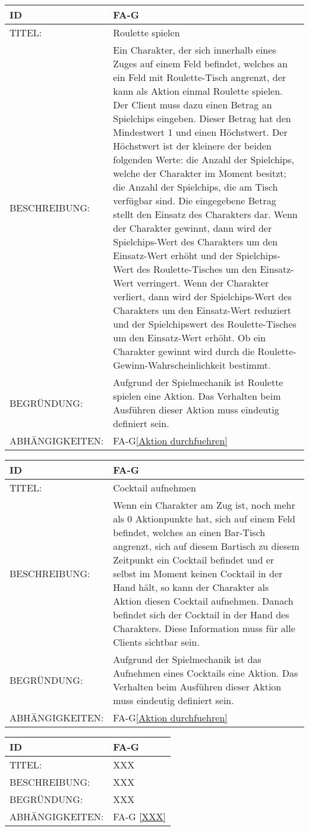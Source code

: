 \begin{tabularx}{16cm}{l|X}
	{table}\label{Roulette spielen}
	\textbf{ID} & \textbf{FA-G\arabic{table}} \\
	\hline
	TITEL: & Roulette spielen \\
	\hline
	BESCHREIBUNG: & Ein Charakter, der sich innerhalb eines Zuges auf einem Feld befindet, welches an ein Feld mit Roulette-Tisch angrenzt, der kann als Aktion einmal Roulette spielen. Der Client muss dazu einen Betrag an Spielchips eingeben. Dieser Betrag hat den Mindestwert 1 und einen Höchstwert. Der Höchstwert ist der kleinere der beiden folgenden Werte: die Anzahl der Spielchips, welche der Charakter im Moment besitzt; die Anzahl der Spielchips, die am Tisch verfügbar sind. Die eingegebene Betrag stellt den Einsatz des Charakters dar. Wenn der Charakter gewinnt, dann wird der Spielchips-Wert des Charakters um den Einsatz-Wert erhöht und der Spielchips-Wert des Roulette-Tisches um den Einsatz-Wert verringert. Wenn der Charakter verliert, dann wird der Spielchips-Wert des Charakters um den Einsatz-Wert reduziert und der Spielchipswert des Roulette-Tisches um den Einsatz-Wert erhöht. Ob ein Charakter gewinnt wird durch die Roulette-Gewinn-Wahrscheinlichkeit bestimmt.\\
	 
	\hline
	BEGRÜNDUNG: & Aufgrund der Spielmechanik ist Roulette spielen eine Aktion. Das Verhalten beim Ausführen dieser Aktion muss eindeutig definiert sein.\\
	\hline
	ABHÄNGIGKEITEN: & FA-G\ref{Aktion durchfuehren} \todo[inline]{2.8.1 Wahlphase}\\
\end{tabularx}

\begin{tabularx}{16cm}{l|X}
	{table}\label{Cocktail aufnehmen}
	\textbf{ID} & \textbf{FA-G\arabic{table}} \\
	\hline
	TITEL: & Cocktail aufnehmen \\
	\hline
	BESCHREIBUNG: & Wenn ein Charakter am Zug ist, noch mehr als 0 Aktionpunkte hat, sich auf einem Feld befindet, welches an einen Bar-Tisch angrenzt, sich auf diesem Bartisch zu diesem Zeitpunkt ein Cocktail befindet und er selbst im Moment keinen Cocktail in der Hand hält, so kann der Charakter als Aktion diesen Cocktail aufnehmen. Danach befindet sich der Cocktail in der Hand des Charakters. Diese Information muss für alle Clients sichtbar sein.\\
	 
	\hline
	BEGRÜNDUNG: & Aufgrund der Spielmechanik ist das Aufnehmen eines Cocktails eine Aktion. Das Verhalten beim Ausführen dieser Aktion muss eindeutig definiert sein.\\
	\hline
	ABHÄNGIGKEITEN: & FA-G\ref{Aktion durchfuehren} \todo[inline]{2.8.1 Wahlphase}\\
\end{tabularx}

\begin{tabularx}{16cm}{l|X}
	{table}\label{XXX}
	\textbf{ID} & \textbf{FA-G \arabic{table}} \\
	\hline
	TITEL: & XXX \\
	\hline
	BESCHREIBUNG: & XXX \\
	\hline
	BEGRÜNDUNG: & XXX \\
	\hline
	ABHÄNGIGKEITEN: & FA-G \ref{XXX} \\
\end{tabularx}
